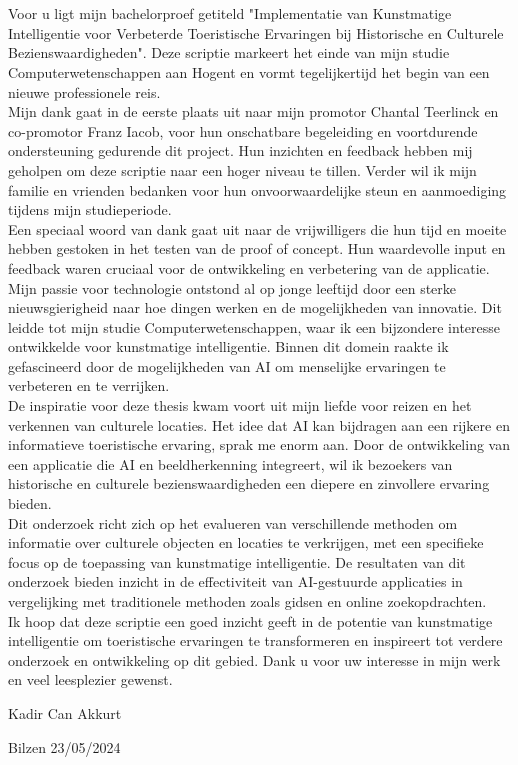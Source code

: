 


\chapter*{}%
\label{ch:voorwoord}

Voor u ligt mijn bachelorproef getiteld "Implementatie van Kunstmatige Intelligentie voor Verbeterde Toeristische Ervaringen bij Historische en Culturele Bezienswaardigheden". Deze scriptie markeert het einde van mijn studie Computerwetenschappen aan Hogent en vormt tegelijkertijd het begin van een nieuwe professionele reis.
\\
Mijn dank gaat in de eerste plaats uit naar mijn promotor Chantal Teerlinck en co-promotor Franz Iacob, voor hun onschatbare begeleiding en voortdurende ondersteuning gedurende dit project. Hun inzichten en feedback hebben mij geholpen om deze scriptie naar een hoger niveau te tillen. Verder wil ik mijn familie en vrienden bedanken voor hun onvoorwaardelijke steun en aanmoediging tijdens mijn studieperiode.
\\
Een speciaal woord van dank gaat uit naar de vrijwilligers die hun tijd en moeite hebben gestoken in het testen van de proof of concept. Hun waardevolle input en feedback waren cruciaal voor de ontwikkeling en verbetering van de applicatie.
\\
Mijn passie voor technologie ontstond al op jonge leeftijd door een sterke nieuwsgierigheid naar hoe dingen werken en de mogelijkheden van innovatie. Dit leidde tot mijn studie Computerwetenschappen, waar ik een bijzondere interesse ontwikkelde voor kunstmatige intelligentie. Binnen dit domein raakte ik gefascineerd door de mogelijkheden van AI om menselijke ervaringen te verbeteren en te verrijken.
\\
De inspiratie voor deze thesis kwam voort uit mijn liefde voor reizen en het verkennen van culturele locaties. Het idee dat AI kan bijdragen aan een rijkere en informatieve toeristische ervaring, sprak me enorm aan. Door de ontwikkeling van een applicatie die AI en beeldherkenning integreert, wil ik bezoekers van historische en culturele bezienswaardigheden een diepere en zinvollere ervaring bieden.
\\
Dit onderzoek richt zich op het evalueren van verschillende methoden om informatie over culturele objecten en locaties te verkrijgen, met een specifieke focus op de toepassing van kunstmatige intelligentie. De resultaten van dit onderzoek bieden inzicht in de effectiviteit van AI-gestuurde applicaties in vergelijking met traditionele methoden zoals gidsen en online zoekopdrachten.
\\
Ik hoop dat deze scriptie een goed inzicht geeft in de potentie van kunstmatige intelligentie om toeristische ervaringen te transformeren en inspireert tot verdere onderzoek en ontwikkeling op dit gebied.
\newline
Dank u voor uw interesse in mijn werk en veel leesplezier gewenst.
\newline


Kadir Can Akkurt

Bilzen 23/05/2024
\\